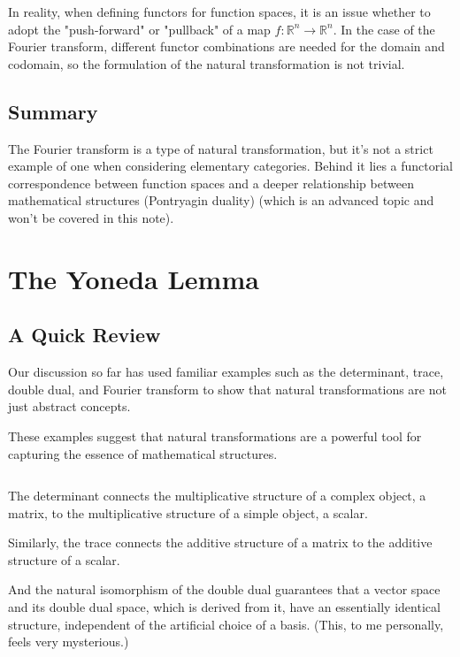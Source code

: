 \documentclass[uplatex,a4j,12pt,dvipdfmx]{jsarticle}
\begin{document}
In reality, when defining functors for function spaces, it is an issue whether to adopt the "push-forward" or "pullback" of a map $f: \mathbb{R}^n \to \mathbb{R}^n$.
In the case of the Fourier transform, different functor combinations are needed for the domain and codomain, so the formulation of the natural transformation is not trivial.

\subsection{Summary}

The Fourier transform is a type of natural transformation, but it's not a strict example of one when considering elementary categories.
Behind it lies a functorial correspondence between function spaces and a deeper relationship between mathematical structures (Pontryagin duality) (which is an advanced topic and won't be covered in this note).







\section{The Yoneda Lemma}

\subsection{A Quick Review}

Our discussion so far has used familiar examples such as the determinant, trace, double dual, and Fourier transform to show that natural transformations are not just abstract concepts.

These examples suggest that natural transformations are a powerful tool for capturing the essence of mathematical structures.

	${}$

The determinant connects the multiplicative structure of a complex object, a matrix, to the multiplicative structure of a simple object, a scalar.

Similarly, the trace connects the additive structure of a matrix to the additive structure of a scalar.

And the natural isomorphism of the double dual guarantees that a vector space and its double dual space, which is derived from it, have an essentially identical structure, independent of the artificial choice of a basis.
(This, to me personally, feels very mysterious.)
\end{document}
